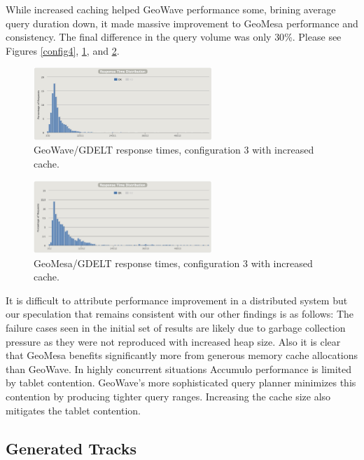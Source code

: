While increased caching helped GeoWave performance some, brining average query duration down, it made massive improvement to GeoMesa performance and consistency.
The final difference in the query volume was only $30$\%.
Please see Figures \ref{config4}, \ref{config4distrogw}, and \ref{config4distrogm}.

\begin{figure}[h!tb]
  \centering
  \includegraphics[width=0.60\textwidth]{images/mt4-gw.png}
  \caption{GeoWave/GDELT response times, configuration 3 with increased cache.}
  \label{config4distrogw}
\end{figure}

\begin{figure}[h!tb]
  \centering
  \includegraphics[width=0.60\textwidth]{images/gm-4.png}
  \caption{GeoMesa/GDELT response times, configuration 3 with increased cache.}
  \label{config4distrogm}
\end{figure}

It is difficult to attribute performance improvement in a distributed system but our speculation that remains consistent with our other findings is as follows: The failure cases seen in the initial set of results are likely due to garbage collection pressure as they were not reproduced with increased heap size.
Also it is clear that GeoMesa benefits significantly more from generous memory cache allocations than GeoWave.
In highly concurrent situations Accumulo performance is limited by tablet contention.
GeoWave's more sophisticated query planner minimizes this contention by producing tighter query ranges.
Increasing the cache size also mitigates the tablet contention.

\subsection{Generated Tracks}

